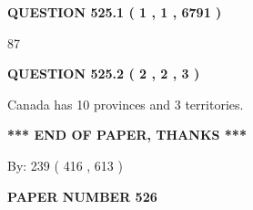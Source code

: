 \documentclass[12pt]{article}
\begin{document}
   
   
   
 \vspace{0.2in}
 
 
 
 
   
   
  
\vspace{0.2in}
  
{\textbf{\Large{QUESTION
525.1 
 ( 1 , 1 , 6791 )
}}}
  
  
 
 
\noindent{}

87
 
 
  
\vspace{0.2in}
  
{\textbf{\Large{QUESTION
525.2 
 ( 2 , 2 , 3 )
}}}
  
  
 
 
\noindent{}
 
 
Canada has 10  provinces and 3 territories.
 
 
 
 
   
   
 \vspace{0.2in}
 
   
   
   
   
\vspace{1.0in} 
{\textbf{\large{ *** END OF PAPER, THANKS *** }}} 
   
   
\hspace{1.0in} By: 
 239 ( 416 ,  613 )
   
   
   
   
\newpage 
\setcounter{page}{ 
   526001 } 
   
   
   
   
 {\textbf{ \Large{ PAPER NUMBER  526  }}}
   
   
\vspace{0.2in}
   
   
   
   
   
   
 \vspace{0.2in}
 
 
 
 
   
\end{document}
